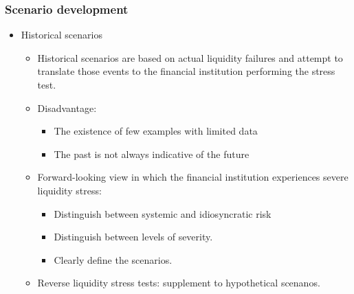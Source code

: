 \subsubsection{Scenario development}
\begin{itemize}
\item Historical scenarios
    \begin{itemize}
    \item Historical scenarios are based on actual liquidity failures and attempt to translate those events to the financial institution performing the stress test.
    \item Disadvantage:
        \begin{itemize}
        \item The existence of few examples with limited data
        \item The past is not always indicative of the future
        \end{itemize}
        
    \item Forward-looking view in which the financial institution experiences severe liquidity stress:
        \begin{itemize}
        \item Distinguish between systemic and idiosyncratic risk
        \item Distinguish between levels of severity.
        \item Clearly define the scenarios.
        \end{itemize}
        
    \item Reverse liquidity stress tests: supplement to hypothetical scenanos.
    \end{itemize}

\end{itemize}



